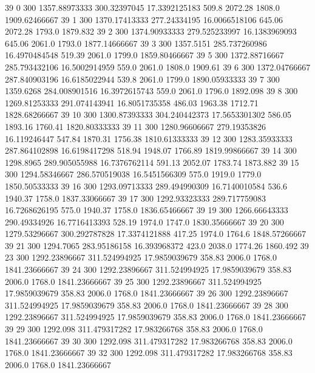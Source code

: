 39  0  300  1357.88973333  300.32397045  17.3392125183  509.8  2072.28  1808.0  1909.62466667 
39  1  300  1370.17413333  277.24334195  16.0066518106  645.06  2072.28  1793.0  1879.832 
39  2  300  1374.90933333  279.525233997  16.1383969093  645.06  2061.0  1793.0  1877.14666667 
39  3  300  1357.5151  285.737260986  16.4970484548  519.39  2061.0  1799.0  1859.80466667 
39  5  300  1372.88716667  285.793432106  16.5002914959  559.0  2061.0  1808.0  1909.61 
39  6  300  1372.04766667  287.840903196  16.6185022944  539.8  2061.0  1799.0  1890.05933333 
39  7  300  1359.6268  284.008901516  16.3972615743  559.0  2061.0  1796.0  1892.098 
39  8  300  1269.81253333  291.074143941  16.8051735358  486.03  1963.38  1712.71  1828.68266667 
39  10  300  1300.87393333  304.240442373  17.5653301302  586.05  1893.16  1760.41  1820.80333333 
39  11  300  1280.96606667  279.19353826  16.119246447  547.84  1870.31  1756.38  1810.61333333 
39  12  300  1283.35933333  287.864102898  16.6198417298  518.94  1948.07  1766.89  1819.99866667 
39  14  300  1298.8965  289.905055988  16.7376762114  591.13  2052.07  1783.74  1873.882 
39  15  300  1294.58346667  286.570519038  16.5451566309  575.0  1919.0  1779.0  1850.50533333 
39  16  300  1293.09713333  289.494990309  16.7140010584  536.6  1940.37  1758.0  1837.33066667 
39  17  300  1292.93323333  289.717759083  16.7268626195  575.0  1940.37  1758.0  1836.65466667 
39  19  300  1266.66643333  290.49334926  16.7716413393  528.19  1974.0  1747.0  1830.35666667 
39  20  300  1279.53296667  300.292787828  17.3374121888  417.25  1974.0  1764.6  1848.57266667 
39  21  300  1294.7065  283.95186158  16.393968372  423.0  2038.0  1774.26  1860.492 
39  23  300  1292.23896667  311.524994925  17.9859039679  358.83  2006.0  1768.0  1841.23666667 
39  24  300  1292.23896667  311.524994925  17.9859039679  358.83  2006.0  1768.0  1841.23666667 
39  25  300  1292.23896667  311.524994925  17.9859039679  358.83  2006.0  1768.0  1841.23666667 
39  26  300  1292.23896667  311.524994925  17.9859039679  358.83  2006.0  1768.0  1841.23666667 
39  28  300  1292.23896667  311.524994925  17.9859039679  358.83  2006.0  1768.0  1841.23666667 
39  29  300  1292.098  311.479317282  17.983266768  358.83  2006.0  1768.0  1841.23666667 
39  30  300  1292.098  311.479317282  17.983266768  358.83  2006.0  1768.0  1841.23666667 
39  32  300  1292.098  311.479317282  17.983266768  358.83  2006.0  1768.0  1841.23666667 


